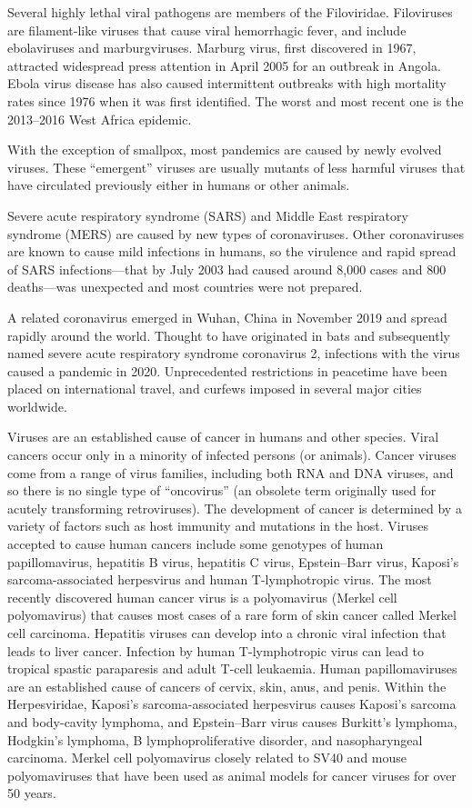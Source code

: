 Several highly lethal viral pathogens are members of the Filoviridae. Filoviruses are filament-like viruses that cause viral hemorrhagic fever, and include ebolaviruses and marburgviruses. Marburg virus, first discovered in 1967, attracted widespread press attention in April 2005 for an outbreak in Angola. Ebola virus disease has also caused intermittent outbreaks with high mortality rates since 1976 when it was first identified. The worst and most recent one is the 2013--2016 West Africa epidemic.

With the exception of smallpox, most pandemics are caused by newly evolved viruses. These ``emergent'' viruses are usually mutants of less harmful viruses that have circulated previously either in humans or other animals.

Severe acute respiratory syndrome (SARS) and Middle East respiratory syndrome (MERS) are caused by new types of coronaviruses. Other coronaviruses are known to cause mild infections in humans, so the virulence and rapid spread of SARS infections---that by July 2003 had caused around 8,000 cases and 800 deaths---was unexpected and most countries were not prepared.

A related coronavirus emerged in Wuhan, China in November 2019 and spread rapidly around the world. Thought to have originated in bats and subsequently named severe acute respiratory syndrome coronavirus 2, infections with the virus caused a pandemic in 2020. Unprecedented restrictions in peacetime have been placed on international travel, and curfews imposed in several major cities worldwide.

Viruses are an established cause of cancer in humans and other species. Viral cancers occur only in a minority of infected persons (or animals). Cancer viruses come from a range of virus families, including both RNA and DNA viruses, and so there is no single type of ``oncovirus'' (an obsolete term originally used for acutely transforming retroviruses). The development of cancer is determined by a variety of factors such as host immunity and mutations in the host. Viruses accepted to cause human cancers include some genotypes of human papillomavirus, hepatitis B virus, hepatitis C virus, Epstein--Barr virus, Kaposi's sarcoma-associated herpesvirus and human T-lymphotropic virus. The most recently discovered human cancer virus is a polyomavirus (Merkel cell polyomavirus) that causes most cases of a rare form of skin cancer called Merkel cell carcinoma. Hepatitis viruses can develop into a chronic viral infection that leads to liver cancer. Infection by human T-lymphotropic virus can lead to tropical spastic paraparesis and adult T-cell leukaemia. Human papillomaviruses are an established cause of cancers of cervix, skin, anus, and penis. Within the Herpesviridae, Kaposi's sarcoma-associated herpesvirus causes Kaposi's sarcoma and body-cavity lymphoma, and Epstein--Barr virus causes Burkitt's lymphoma, Hodgkin's lymphoma, B lymphoproliferative disorder, and nasopharyngeal carcinoma. Merkel cell polyomavirus closely related to SV40 and mouse polyomaviruses that have been used as animal models for cancer viruses for over 50 years.


